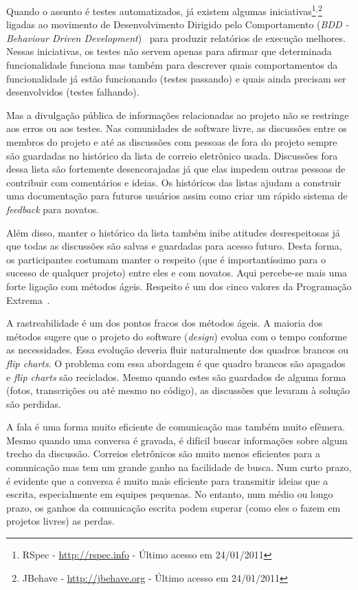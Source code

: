 Quando o assunto é testes automatizados, já existem algumas
iniciativas\footnote{RSpec - \url{http://rspec.info} - Último acesso
  em 24/01/2011}$^{, }$\footnote{JBehave - \url{http://jbehave.org} -
  Último acesso em 24/01/2011} ligadas ao movimento de Desenvolvimento
Dirigido pelo Comportamento (\emph{BDD - Behaviour Driven
  Development})~\cite{North2006} para produzir relatórios de execução
melhores. Nessas iniciativas, os testes não servem apenas para afirmar
que determinada funcionalidade funciona mas também para descrever
quais comportamentos da funcionalidade já estão funcionando (testes
passando) e quais ainda precisam ser desenvolvidos (testes falhando).

Mas a divulgação pública de informações relacionadas ao projeto não se
restringe aos erros ou aos testes. Nas comunidades de software livre,
as discussões entre os membros do projeto e até as discussões com
pessoas de fora do projeto sempre são guardadas no histórico da lista
de correio eletrônico usada. Discussões fora dessa lista são
fortemente desencorajadas já que elas impedem outras pessoas de
contribuir com comentários e ideias. Os históricos das listas ajudam a
construir uma documentação para futuros usuários assim como criar um
rápido sistema de \emph{feedback} para novatos.

Além disso, manter o histórico da lista também inibe atitudes
desrespeitosas já que todas as discussões são salvas e guardadas para
acesso futuro. Desta forma, os participantes costumam manter o
respeito (que é importantíssimo para o sucesso de qualquer projeto)
entre eles e com novatos. Aqui percebe-se mais uma forte ligação com
métodos ágeis. Respeito é um dos cinco valores da Programação
Extrema~\cite{XP02}.

A rastreabilidade é um dos pontos fracos dos métodos ágeis. A maioria
dos métodos sugere que o projeto do software (\emph{design}) evolua
com o tempo conforme as necessidades. Essa evolução deveria fluir
naturalmente dos quadros brancos ou \emph{flip charts}. O problema com
essa abordagem é que quadro brancos são apagados e \emph{flip charts}
são reciclados.  Mesmo quando estes são guardados de alguma forma
(fotos, transcrições ou até mesmo no código), as discussões que
levaram à solução são perdidas.

A fala é uma forma muito eficiente de comunicação mas também muito
efêmera. Mesmo quando uma conversa é gravada, é difícil buscar
informações sobre algum trecho da discussão. Correios eletrônicos são
muito menos eficientes para a comunicação mas tem um grande ganho na
facilidade de busca. Num curto prazo, é evidente que a conversa é
muito mais eficiente para transmitir ideias que a escrita,
especialmente em equipes pequenas. No entanto, num médio ou longo
prazo, os ganhos da comunicação escrita podem superar (como eles o
fazem em projetos livres) as perdas.

